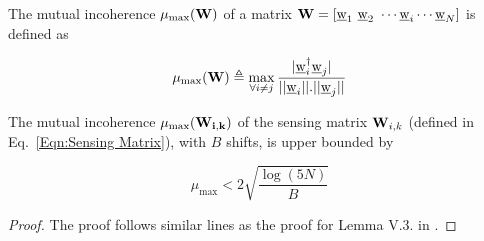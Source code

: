 \begin{definition}
	The mutual incoherence $\mu_{\text{max}}( \mathbf{W})$ of a matrix $\mathbf{W} = [\underline{\mathrm{w}}_1 ~ \underline{\mathrm{w}}_2 ~ \cdots \underline{\mathrm{w}}_i \cdots \underline{\mathrm{w}}_N ]$ is defined as 
	
	\[\mu_{\text{max}}(\mathbf{W}) \triangleq \max \limits_{\forall i \neq j} \frac{|\underline{\mathrm{w}}_i^{\dagger} \underline{\mathrm{w}}_j |}{||\underline{\mathrm{w}}_i || . ||\underline{\mathrm{w}}_j ||} \]
		
\end{definition}
\begin{lemma}
	The mutual incoherence $\mu_{\text{max}} (\mathbf{W_{i,k}})$ of the sensing matrix $\mathbf{W}_{i,k}$ (defined in Eq.~\ref{Eqn:Sensing Matrix}), with $B$ shifts, is upper bounded by
	
	\[ \mu_{\text{max}} < 2\sqrt{\frac{\log(5N)}{B}} \] 
	
\end{lemma}
\begin{proof}
	The proof follows similar lines as the proof for Lemma V.3. in \cite{pawar2014robust}.
\end{proof}
 
